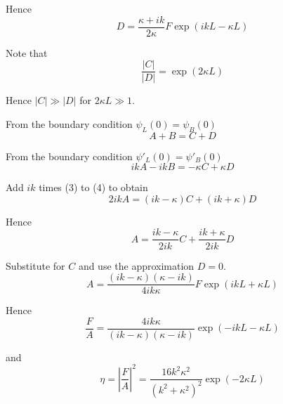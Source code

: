 Hence
\begin{equation*}
D=\frac{\kappa+ik}{2\kappa}F\exp(ikL-\kappa L)
\end{equation*}

Note that
\begin{equation*}
\frac{|C|}{|D|}=\exp(2\kappa L)
\end{equation*}

Hence $|C|\gg|D|$ for $2\kappa L\gg1$.

\bigskip
From the boundary condition $\psi_L(0)=\psi_B(0)$
\begin{equation*}
A+B=C+D
\tag{3}
\end{equation*}

From the boundary condition $\psi'_L(0)=\psi'_B(0)$
\begin{equation*}
ikA-ikB=-\kappa C+\kappa D
\tag{4}
\end{equation*}

Add $ik$ times (3) to (4) to obtain
\begin{equation*}
2ikA=(ik-\kappa)C+(ik+\kappa)D
\end{equation*}

Hence
\begin{equation*}
A=\frac{ik-\kappa}{2ik}C+\frac{ik+\kappa}{2ik}D
\end{equation*}

Substitute for $C$ and use the approximation $D=0$.
\begin{equation*}
A=\frac{(ik-\kappa)(\kappa-ik)}{4ik\kappa}F\exp(ikL+\kappa L)
\end{equation*}

Hence
\begin{equation*}
\frac{F}{A}=\frac{4ik\kappa}{(ik-\kappa)(\kappa-ik)}\exp(-ikL-\kappa L)
\end{equation*}

and
\begin{equation*}
\eta=\left|\frac{F}{A}\right|^2=\frac{16k^2\kappa^2}{\left(k^2+\kappa^2\right)^2}\exp(-2\kappa L)
\end{equation*}



